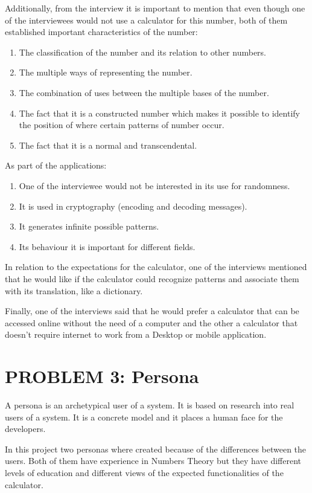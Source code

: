 \documentclass{report}
\begin{document}
Additionally, from the interview it is important to mention that even though one of the interviewees would not use a calculator for this number, both of them established important characteristics of the number:
\begin{enumerate}
\item {The classification of the number and its relation to other numbers.}
\item {The multiple ways of representing the number.}
\item {The combination of uses between the multiple bases of the number.}
\item {The fact that it is a constructed number which makes it possible to identify the position of where certain patterns of number occur.}
\item {The fact that it is a normal and transcendental.}
\end{enumerate}
As part of the applications:
\begin{enumerate}
\item {One of the interviewee would not be interested in its use for randomness.}
\item {It is used in cryptography (encoding and decoding messages).}
\item {It generates infinite possible patterns.}
\item {Its behaviour it is important for different fields.}
\end{enumerate}
In relation to the expectations for the calculator, one of the interviews mentioned that he would like if the calculator could recognize patterns and associate them with its translation, like a dictionary. 

Finally, one of the interviews said that he would prefer a calculator that can be accessed online without the need of a computer and the other a calculator that doesn't require internet to work from a Desktop or mobile application.

\section{PROBLEM 3: Persona}

A persona is an archetypical user of a system. It is based on research into real users of a system.  It is a concrete model and it places a human face for the developers.

In this project two personas where created because of the differences between the users. Both of them have experience in Numbers Theory but they have different levels of education and different views of the expected functionalities of the calculator.
\end{document}
